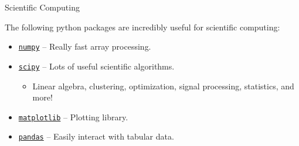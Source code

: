 \begin{frame}{Scientific Computing}

 The following python packages are incredibly useful for scientific computing:

 \begin{itemize}

  \item \href{http://wiki.scipy.org/Tentative_NumPy_Tutorial}{\texttt{numpy}} 
   -- Really fast array processing.

  \item 
   \href{http://docs.scipy.org/doc/scipy/reference/tutorial/general.html}{\texttt{scipy}}
    -- Lots of useful scientific algorithms.

   \begin{itemize}
    \item Linear algebra, clustering, optimization, signal processing, 
     statistics, and more!
   \end{itemize}

  \item 
   \href{http://matplotlib.org/users/pyplot_tutorial.html}{\texttt{matplotlib}} 
   -- Plotting library.

  \item 
   \href{http://pandas.pydata.org/pandas-docs/stable/10min.html}{\texttt{pandas}} 
   -- Easily interact with tabular data.

 \end{itemize}

\end{frame}
